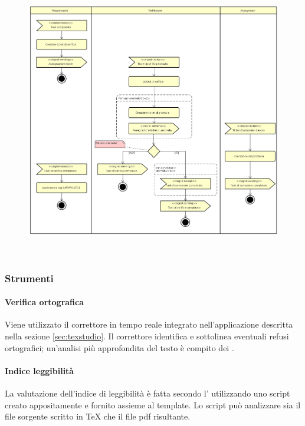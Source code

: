             \begin{figure}[h]
		        \includegraphics[width=\textwidth]{img/verifica_gestione_task}
                \label{fig:verificagestione}
	        \end{figure}\mbox{}\\

        \subsubsection{Strumenti}
            \paragraph{Verifica ortografica}
            Viene utilizzato il correttore in tempo reale integrato nell'applicazione  descritta nella sezione \ref{sec:texstudio}. Il correttore identifica e sottolinea eventuali refusi ortografici; un'analisi più approfondita del testo è compito dei \verificatori.
            \paragraph{Indice leggibilità}
            La valutazione dell'indice di leggibilità è fatta secondo l' utilizzando uno script creato appositamente e fornito assieme al template. Lo script può analizzare sia il file sorgente scritto in \TeX{} che il file pdf risultante.
